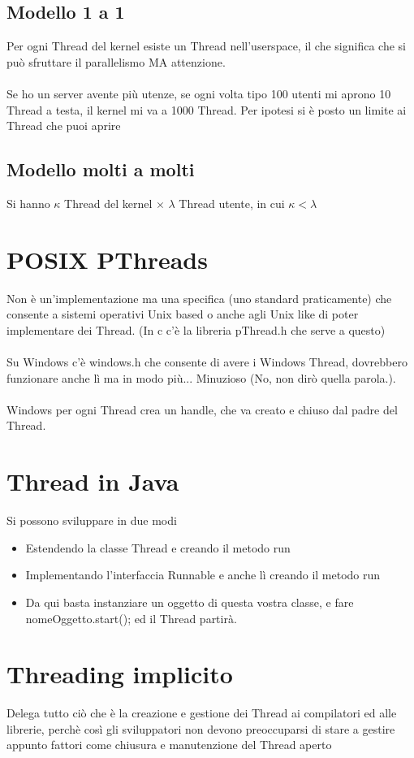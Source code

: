 \documentclass[12pt, a4paper, openany, twoside]{book}
\begin{document}
\subsection{Modello 1 a 1 } Per ogni Thread del kernel esiste un Thread 
nell'userspace, il che significa che si può sfruttare il parallelismo MA
attenzione.
\\ \\
Se ho un server avente più utenze, se ogni volta tipo 100 utenti mi aprono 
10 Thread a testa, il kernel mi va a 1000 Thread. Per ipotesi si è posto
un limite ai Thread che puoi aprire
\subsection{Modello molti a molti}
Si hanno $\kappa$ Thread del kernel $\times$ $\lambda$ Thread utente, in cui
$\kappa < \lambda$
\section{POSIX PThreads}
Non è un'implementazione ma una specifica (uno standard praticamente) che
consente a sistemi operativi Unix based o anche agli Unix like di poter 
implementare dei Thread. (In c c'è la libreria pThread.h che serve a questo)\\ \\
Su Windows c'è windows.h che consente di avere i Windows Thread, dovrebbero
funzionare anche lì ma in modo più... Minuzioso (No, non dirò quella parola.).
\\ \\
Windows per ogni Thread crea un handle, che va creato e chiuso dal padre del 
Thread.
\section{Thread in Java}
Si possono sviluppare in due modi
\begin{itemize}
	\item Estendendo la classe Thread e creando il metodo run
	\item Implementando l'interfaccia Runnable e anche lì creando il metodo run
	\item Da qui basta instanziare un oggetto di questa vostra classe, e fare
	nomeOggetto.start(); ed il Thread partirà.
\end{itemize}
\section{Threading implicito}
Delega tutto ciò che è la creazione e gestione dei Thread ai compilatori ed 
alle librerie, perchè così gli sviluppatori non devono preoccuparsi di stare
a gestire appunto fattori come chiusura e manutenzione del Thread aperto
\end{document}
